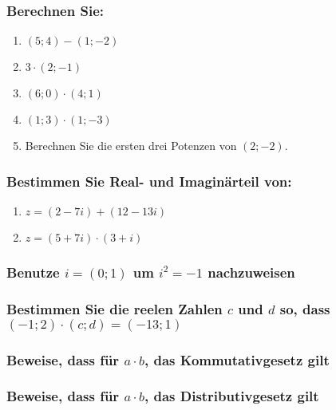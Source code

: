 \subsubsection{Berechnen Sie:}

\begin{enumerate}[label=\alph*)]
    \item $\left(5; 4\right) - \left(1; -2\right)$
    \item $3 \cdot \left(2; -1\right)$
    \item $\left(6; 0\right) \cdot \left(4; 1\right)$
    \item $\left(1; 3\right) \cdot \left(1; -3\right)$
    \item Berechnen Sie die ersten drei Potenzen von $\left(2; -2\right)$.
\end{enumerate}

\subsubsection{Bestimmen Sie Real- und Imaginärteil von: }

\begin{enumerate}[label=\alph*)]
    \item $z = \left(2 - 7i\right) + \left(12 - 13i\right)$
    \item $z = \left(5 + 7i\right) \cdot \left(3 + i\right)$
\end{enumerate}


\subsubsection{Benutze $i = \left(0;1\right)$ um $i^2 = - 1$ nachzuweisen}

\subsubsection{Bestimmen Sie die reelen Zahlen $c$ und $d$ so, dass $\left(-1; 2\right) \cdot \left(c; d\right) = \left(-13; 1\right)$}

\subsubsection{Beweise, dass für $a \cdot b$, das Kommutativgesetz gilt}
\subsubsection{Beweise, dass für $a \cdot b$, das Distributivgesetz gilt}
